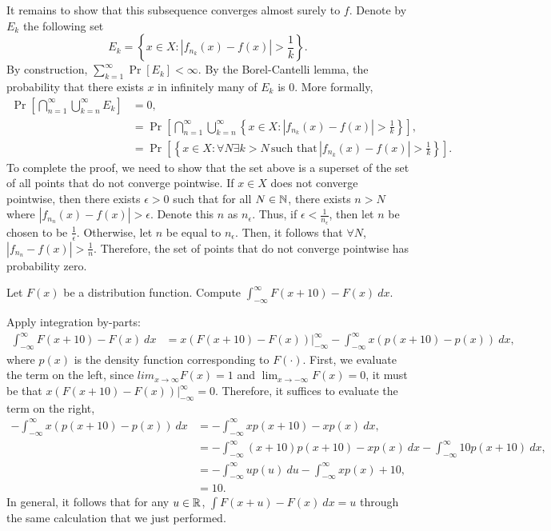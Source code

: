 \begin{solution}
    It remains to show that this subsequence converges almost surely to $f$. Denote by $E_k$ the following set 
    \[
        E_k = \left\{x \in X: |f_{n_k}(x) - f(x)| > \frac{1}{k}\right\}.
    \]
    By construction, $\sum_{k=1}^\infty \Pr[E_k] < \infty$. By the Borel-Cantelli lemma, the probability that there exists $x$ in infinitely many of $E_k$ is 0. More formally, 
    \begin{align*}
        \Pr\left[\bigcap_{n=1}^\infty \bigcup_{k=n}^\infty E_k\right] &= 0, \\
        &= \Pr\left[\bigcap_{n=1}^\infty\bigcup_{k=n}^\infty \left\{x \in X: |f_{n_k}(x) - f(x)| > \frac{1}{k}\right\}\right], \\
        &= \Pr\left[\left\{x \in X: \forall N \exists k > N\,\text{such that}\, |f_{n_k}(x) - f(x) | > \frac{1}{k}\right\}\right].
    \end{align*}
    To complete the proof, we need to show that the set above is a superset of the set of all points that do not converge pointwise. If $x \in X$ does not converge pointwise, then there exists $\epsilon > 0$ such that for all $N \in \mathbb{N}$, there exists $n > N$ where $|f_{n_n}(x) - f(x)| > \epsilon$. Denote this $n$ as $n_\epsilon$. Thus, if $\epsilon < \frac{1}{n_\epsilon}$, then let $n$ be chosen to be $\frac{1}{\epsilon}$. Otherwise, let $n$ be equal to $n_\epsilon$. Then, it follows that $\forall N$, $|f_{n_n} - f(x)| > \frac{1}{n}$. Therefore, the set of points that do not converge pointwise has probability zero. 
\end{solution}

\begin{problem}{9}
Let $F(x)$ be a distribution function. Compute $\int_{-\infty}^\infty F(x+10) - F(x)~dx$.
\end{problem}
\begin{solution}
    Apply integration by-parts:
    \begin{align*}
        \int_{-\infty}^\infty F(x+10) - F(x)~dx &= x(F(x+10) - F(x)) \Big\vert_{-\infty}^\infty - \int_{-\infty}^\infty x(p(x+10) - p(x))~dx, 
    \end{align*}
    where $p(x)$ is the density function corresponding to $F(\cdot)$. First, we evaluate the term on the left, since $lim_{x\to\infty} F(x) = 1$ and $\lim_{x\to-\infty} F(x) = 0$, it must be that $x(F(x+10) - F(x)) \Big\vert_{-\infty}^\infty = 0$. Therefore, it suffices to evaluate the term on the right, 
    \begin{align*}
        -\int_{-\infty}^\infty x(p(x+10) - p(x))~dx &= -\int_{-\infty}^\infty xp(x+10) - xp(x)~dx, \\
        &= -\int_{-\infty}^\infty (x+10)p(x+10) - xp(x)~dx - \int_{-\infty}^\infty 10p(x+10)~dx, \\
        &= -\int_{-\infty}^\infty up(u)~du - \int_{-\infty}^\infty xp(x) + 10, \\
        &= 10.
    \end{align*}
    In general, it follows that for any $u \in \mathbb{R}$, $\int F(x + u) - F(x)~dx = u$ through the same calculation that we just performed. 
\end{solution}


